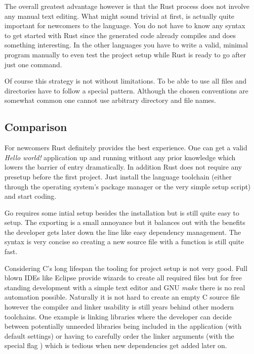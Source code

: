 The overall greatest advantage however is that the Rust process does not involve any manual text editing. What might sound trivial at first, is actually quite important for newcomers to the language. You do not have to know any syntax to get started with Rust since the generated code already compiles and does something interesting. In the other languages you have to write a valid, minimal program manually to even test the project setup while Rust is ready to go after just one command.

Of course this strategy is not without limitations. To be able to use  all files and directories have to follow a special pattern. Although the chosen conventions are somewhat common one cannot use arbitrary directory and file names.

\subsection{Comparison}
\label{subsec:Implementation::Setup::Comparison}

For newcomers Rust definitely provides the best experience. One can get a valid \textit{Hello world!} application up and running without any prior knowledge which lowers the barrier of entry dramatically. In addition Rust does not require any presetup before the first project. Just install the language toolchain (either through the operating system's package manager or the very simple setup script) and start coding.

Go requires some intial setup besides the installation but is still quite easy to setup. The  exporting is a small annoyance but it balances out with the benefits the developer gets later down the line like easy dependency management. The syntax is very concise so creating a new source file with a  function is still quite fast.

Considering C's long lifespan the tooling for project setup is not very good. Full blown IDEs like Eclipse provide wizards to create all required files but for free standing development with a simple text editor and GNU \textit{make} there is no real automation possible. Naturally it is not hard to create an empty C source file however the compiler and linker usability is still years behind other modern toolchains. One example is linking libraries where the developer can decide between potentially unneeded libraries being included in the application (with default settings) or having to carefully order the linker arguments (with the special flag ) which is tedious when new dependencies get added later on.

